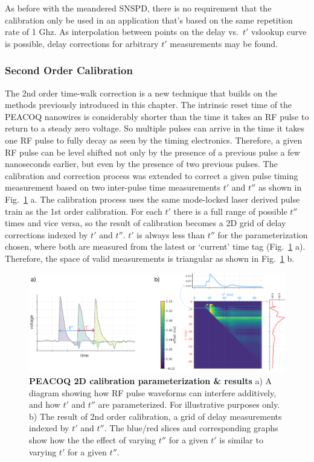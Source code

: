 \documentclass[11pt]{caltech_thesis} %
\begin{document}
As before with the meandered SNSPD, there is no requirement that the calibration only be used in an application that's based on the same repetition rate of 1 Ghz. As interpolation between points on the delay vs.~$t'$ vslookup curve is possible, delay corrections for arbitrary $t'$ measurements may be found.

\hypertarget{second-order-calibration}{%
\subsubsection{Second Order Calibration}\label{second-order-calibration}}

The 2nd order time-walk correction is a new technique that builds on the methods previously introduced in this chapter. The intrinsic reset time of the PEACOQ nanowires is considerably shorter than the time it takes an RF pulse to return to a steady zero voltage. So multiple pulses can arrive in the time it takes one RF pulse to fully decay as seen by the timing electronics. Therefore, a given RF pulse can be level shifted not only by the presence of a previous pulse a few nanoseconds earlier, but even by the presence of two previous pulses. The calibration and correction process was extended to correct a given pulse timing measurement based on two inter-pulse time measurements $t'$ and $t''$ as shown in Fig.~\ref{fig:order_2nd} a. The calibration process uses the same mode-locked laser derived pulse train as the 1st order calibration. For each $t'$ there is a full range of possible $t''$ times and vice versa, so the result of calibration becomes a 2D grid of delay corrections indexed by $t'$ and $t''$. $t'$ is always less than $t''$ for the parameterization chosen, where both are measured from the latest or `current' time tag (Fig.~\ref{fig:order_2nd} a). Therefore, the space of valid measurements is triangular as shown in Fig.~\ref{fig:order_2nd} b.

\hypertarget{fig:order_2nd}{%
\begin{figure}
\centering
\includegraphics[width=1\textwidth,height=\textheight]{chapter_02/figs_02/SOM_Figure_order_2nd_v1_light.pdf}
\caption[{PEACOQ 2D calibration parameterization \& results}]{\textbf{PEACOQ 2D calibration parameterization \& results} a) A diagram showing how RF pulse waveforms can interfere additively, and how $t'$ and $t''$ are parameterized. For illustrative purposes only. b) The result of 2nd order calibration, a grid of delay measurements indexed by $t'$ and $t''$. The blue/red slices and corresponding graphs show how the the effect of varying $t''$ for a given $t'$ is similar to varying $t'$ for a given $t''$.}
\label{fig:order_2nd}
\end{figure}
}
\end{document}
